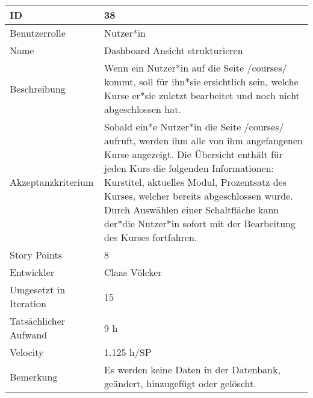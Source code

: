 \begin{tabularx}{\textwidth}{|p{}|X|}
	\hline
	ID & 38 \\
	\hline
	Benutzerrolle & Nutzer*in \\
	\hline
	Name & Dashboard Ansicht strukturieren\\
	\hline
	Beschreibung & Wenn ein Nutzer*in auf die Seite /courses/ kommt, soll für ihn*sie ersichtlich sein, welche Kurse er*sie zuletzt bearbeitet und noch nicht abgeschlossen hat.  \\
	\hline
	Akzeptanzkriterium & Sobald ein*e Nutzer*in die Seite /courses/ aufruft, werden ihm alle von ihm angefangenen Kurse angezeigt. Die Übersicht enthält für jeden Kurs die folgenden Informationen: Kurstitel, aktuelles Modul, Prozentsatz des Kurses, welcher bereits abgeschlossen wurde. Durch Auswählen einer Schaltfläche kann der*die Nutzer*in sofort mit der Bearbeitung des Kurses fortfahren. \\
	\hline
	Story Points & 8\\
	\hline
	Entwickler & Claas Völcker\\
	\hline
	Umgesetzt in Iteration & 15\\
	\hline
	Tatsächlicher Aufwand & 9 h\\
	\hline
	Velocity & 1.125 h/SP \\
	\hline
	Bemerkung & Es werden keine Daten in der Datenbank, geändert, hinzugefügt oder gelöscht.\\
	\hline
\end{tabularx}
\vspace{20pt}
